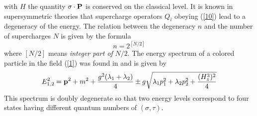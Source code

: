 \documentclass[a4paper,12pt,a4]{article}
\begin{document}
with $H$ the quantity ${\bf \sigma}\cdot{\bf P}$ is conserved on
the classical level.
It is known in supersymmetric theories that supercharge operators
$Q_i$ obeying (\ref{10}) lead to a degeneracy of the energy.
The relation between the
degeneracy $n$ and the number of supercharges $N$
is given by the formula
\begin{equation}
n=2^{[N/2]} 
\label{11}
\end{equation}
where $[N/2]$ means {\it integer part of} $N/2$.  
The energy spectrum of a colored particle in the field
(\ref{1}) was  found in \cite{10} and is given by
\begin{equation}
E^2_{1,2}={\bf p}^2 + m^2 +\frac{g^2(\lambda_1+\lambda_2)}{4} 
\pm g\sqrt{\lambda_1 p^2_1+\lambda_2p^2_2+\frac{(H^3_z)^2}{4}}
\label{12}
\end{equation}
This spectrum is doubly degenerate so that two
energy levels correspond to four states
having different quantum numbers of $(\sigma, \tau)$.
\end{document}
